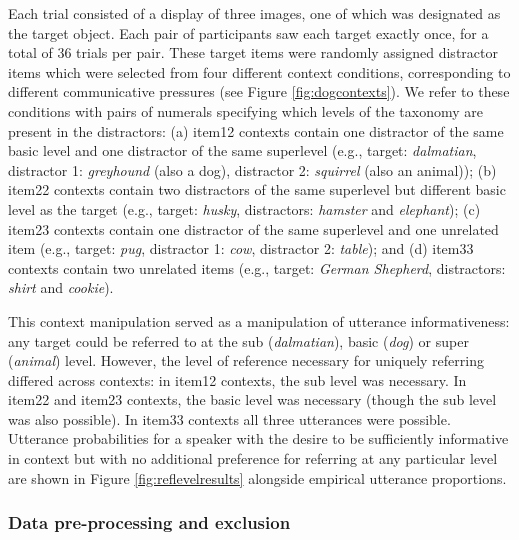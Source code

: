 \documentclass[11pt]{article}
\newcommand{\figref}[1]{Figure \ref{#1}}
\begin{document}
Each trial consisted of a display of three images, one of which was designated as the target object. Each pair of participants saw each target exactly once, for a total of 36 trials per pair. These target items were randomly assigned distractor items which were selected from four different context conditions, corresponding to different communicative pressures (see \figref{fig:dogcontexts}). We refer to these conditions with pairs of numerals specifying which levels of the taxonomy are present in the distractors: (a) item12 contexts contain one distractor of the same basic level and one distractor of the same superlevel (e.g., target: \emph{dalmatian}, distractor 1: \emph{greyhound} (also a dog), distractor 2: \emph{squirrel} (also an animal)); (b) item22 contexts contain two distractors of the same superlevel but different basic level as the target (e.g., target: \emph{husky}, distractors: \emph{hamster} and \emph{elephant}); (c) item23 contexts contain one distractor of the same superlevel and one unrelated item (e.g., target: \emph{pug}, distractor 1: \emph{cow}, distractor 2: \emph{table}); and (d) item33 contexts contain two unrelated items (e.g., target: \emph{German Shepherd}, distractors: \emph{shirt} and \emph{cookie}). 

This context manipulation served as a manipulation of utterance informativeness: any target could be referred to at the sub (\emph{dalmatian}), basic (\emph{dog}) or super (\emph{animal}) level. However, the level of reference necessary for uniquely referring differed across contexts: in item12 contexts, the sub level was necessary. In item22 and item23 contexts, the basic level was necessary (though the sub level was also possible). In item33 contexts all three utterances were possible. Utterance probabilities for a speaker with the desire to be sufficiently informative in context but with no additional preference for referring at any particular level are shown in \figref{fig:reflevelresults} alongside empirical utterance proportions.


\subsubsection{Data pre-processing and exclusion}
\end{document}
